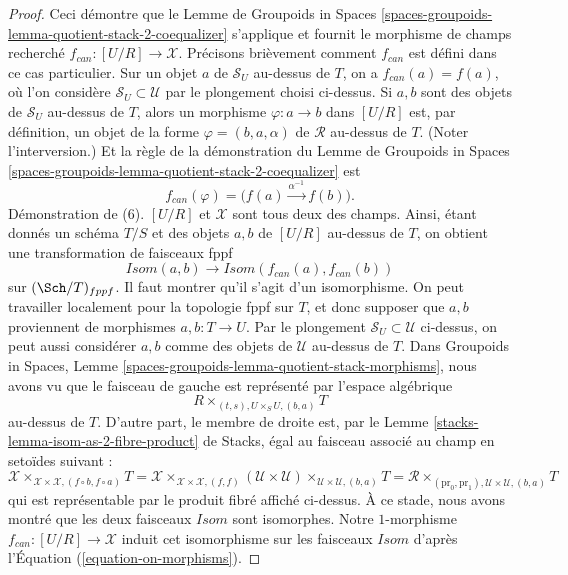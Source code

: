 \begin{proof}
\medskip\noindent
Ceci démontre que le
Lemme de Groupoids in Spaces
\ref{spaces-groupoids-lemma-quotient-stack-2-coequalizer}
s'applique et fournit le morphisme de champs recherché
$f_{can} : [U/R] \to \mathcal{X}$. Précisons brièvement comment
$f_{can}$ est défini dans ce cas particulier.
Sur un objet $a$ de $\mathcal{S}_U$ au-dessus de $T$,
on a $f_{can}(a) = f(a)$, où l'on considère
$\mathcal{S}_U \subset \mathcal{U}$ par le plongement choisi ci-dessus.
Si $a, b$ sont des objets de $\mathcal{S}_U$ au-dessus de $T$, alors un morphisme
$\varphi : a \to b$ dans $[U/R]$ est, par définition, un objet de la
forme $\varphi = (b, a, \alpha)$ de $\mathcal{R}$ au-dessus de $T$. (Noter
l'interversion.) Et la règle de la démonstration du
Lemme de Groupoids in Spaces
\ref{spaces-groupoids-lemma-quotient-stack-2-coequalizer}
est
\begin{equation}
\label{equation-on-morphisms}
f_{can}(\varphi) = \Big(f(a) \xrightarrow{\alpha^{-1}} f(b)\Big).
\end{equation}
Démonstration de (6). $[U/R]$ et $\mathcal{X}$ sont tous deux des champs.
Ainsi, étant donnés un schéma $T/S$ et des objets $a, b$ de $[U/R]$
au-dessus de $T$, on obtient une transformation de faisceaux fppf
$$
\mathit{Isom}(a, b) \longrightarrow \mathit{Isom}(f_{can}(a), f_{can}(b))
$$
sur $(\Sch/T)_{fppf}$. Il faut montrer qu'il s'agit d'un
isomorphisme. On peut travailler localement pour la topologie fppf sur $T$, et donc supposer que
$a, b$ proviennent de morphismes $a, b : T \to U$. Par le plongement
$\mathcal{S}_U \subset \mathcal{U}$ ci-dessus, on peut aussi considérer $a, b$ comme
des objets de $\mathcal{U}$ au-dessus de $T$. Dans
Groupoids in Spaces,
Lemme \ref{spaces-groupoids-lemma-quotient-stack-morphisms},
nous avons vu que le faisceau de gauche est représenté par l'espace algébrique
$$
R \times_{(t, s), U \times_S U, (b, a)} T
$$
au-dessus de $T$. D'autre part, le membre de droite est, par le
Lemme \ref{stacks-lemma-isom-as-2-fibre-product} de Stacks,
égal au faisceau associé au champ en setoïdes suivant :
$$
\mathcal{X}
\times_{\mathcal{X} \times \mathcal{X}, (f \circ b, f \circ a)} T =
\mathcal{X}
\times_{\mathcal{X} \times \mathcal{X}, (f, f)}
(\mathcal{U} \times \mathcal{U})
\times_{\mathcal{U} \times \mathcal{U}, (b, a)} T =
\mathcal{R}
\times_{(\text{pr}_0, \text{pr}_1), \mathcal{U} \times \mathcal{U}, (b, a)} T
$$
qui est représentable par le produit fibré affiché ci-dessus.
À ce stade, nous avons montré que les deux faisceaux $\mathit{Isom}$
sont isomorphes. Notre $1$-morphisme $f_{can} : [U/R] \to \mathcal{X}$ induit
cet isomorphisme sur les faisceaux $\mathit{Isom}$ d'après
l'Équation (\ref{equation-on-morphisms}).
\end{proof}


